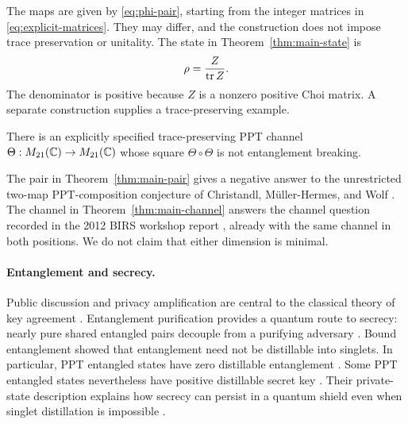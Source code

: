 The maps are given by \eqref{eq:phi-pair}, starting from the integer matrices
in \eqref{eq:explicit-matrices}.  They may differ, and the construction does
not impose trace preservation or unitality.  The state in
Theorem~\ref{thm:main-state} is
\begin{equation}\label{eq:main-state-formula}
                    \rho=\frac{Z}{\operatorname{tr} Z}.
\end{equation}
The denominator is positive because $Z$ is a nonzero positive Choi matrix.
A separate construction supplies a trace-preserving example.

\begin{theorem}\label{thm:main-channel}
There is an explicitly specified trace-preserving PPT channel
$\Theta:M_{21}(\mathbb C)\to M_{21}(\mathbb C)$ whose square $\Theta\circ\Theta$ is not
entanglement breaking.
\end{theorem}

The pair in Theorem~\ref{thm:main-pair} gives a negative answer to the
unrestricted two-map PPT-composition conjecture of Christandl,
M\"uller-Hermes, and Wolf \cite[Conjecture IV.1]{CMHW2019}.  The channel in
Theorem~\ref{thm:main-channel} answers the channel question recorded in the
2012 BIRS workshop report \cite[Problem G]{BIRS2012}, already with the same
channel in both positions.  We do not claim that either dimension is
minimal.

\paragraph{Entanglement and secrecy.}
Public discussion and privacy amplification are central to the classical
theory of key agreement \cite{BennettBrassardRobert88,Maurer93,BBCM95}.
Entanglement purification provides a quantum route to secrecy: nearly pure
shared entangled pairs decouple from a purifying adversary
\cite{BBPSSW96,BDSW96,DeutschEtAl96}.  Bound entanglement showed that
entanglement need not be distillable into singlets.  In particular, PPT
entangled states have zero distillable entanglement \cite{HHH98}.  Some PPT
entangled states nevertheless have positive distillable secret key
\cite{keyBoundEntanglement}.  Their private-state description explains how
secrecy can persist in a quantum shield even when singlet distillation is
impossible \cite{keyPrivateStates}.

